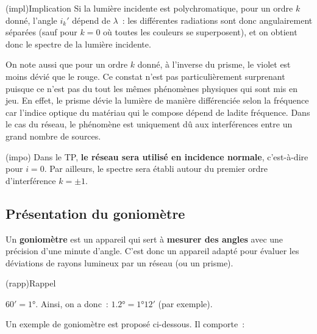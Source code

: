 \documentclass[../main/main.tex]{subfiles}
\begin{document}
\begin{tcb}(impl){Implication}
  Si la lumière incidente est polychromatique, pour un ordre $k$ donné, l'angle
  $i_{k}'$ dépend de $\lambda$~: les différentes radiations sont donc
  angulairement séparées (sauf pour $k = 0$ où toutes les couleurs se
  superposent), et on obtient donc le spectre de la lumière incidente.
\end{tcb}

On note aussi que pour un ordre $k$ donné, à l'inverse du prisme, le violet est
moins dévié que le rouge. Ce constat n'est pas particulièrement surprenant
puisque ce n'est pas du tout les mêmes phénomènes physiques qui sont mis en jeu.
En effet, le prisme dévie la lumière de manière différenciée selon la fréquence
car l'indice optique du matériau qui le compose dépend de ladite fréquence. Dans
le cas du réseau, le phénomène est uniquement dû aux interférences entre un
grand nombre de sources.

\begin{tcb}(impo){}
  Dans le TP, \textbf{le réseau sera utilisé en incidence normale}, c'est-à-dire
  pour $i = 0$. Par ailleurs, le spectre sera établi autour du premier ordre
  d'interférence $k = \pm 1$.
\end{tcb}

\subsection{Présentation du goniomètre}

Un \textbf{goniomètre} est un appareil qui sert à \textbf{mesurer des angles}
avec une précision d'une minute d'angle. C'est donc un appareil adapté pour
évaluer les déviations de rayons lumineux par un réseau (ou un prisme).

\begin{tcb}(rapp){Rappel}
  \begin{center}
      $\ang{;60;} = \ang{1;;}$.
      Ainsi, on a donc~: $\ang{1.2;;}= \ang{1;12;}$ (par exemple).
  \end{center}
\end{tcb}

Un exemple de goniomètre est proposé ci-dessous. Il comporte~: 
\end{document}

